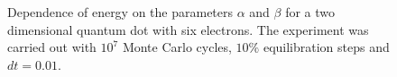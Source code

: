\begin{figure}[!hbt]
    \begin{center}
      \caption{Dependence of energy on the parameters $\alpha$ and $\beta$ for a two dimensional quantum dot with six electrons. The experiment was carried out with $10^7$ Monte Carlo cycles, $10 \%$ equilibration steps and $dt = 0.01$.}
      \label{alphaBeta2DQDot6e}
    \end{center}
  \end{figure}
	
